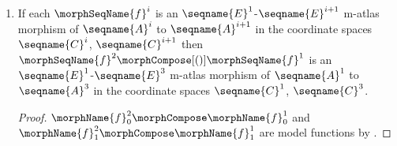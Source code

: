 \documentclass{article}
\begin{document}
\begin{lemma}
\begin{enumerate}
\begin{proof}
\begin{figure}[ht]
\[ \bfig
\node x(0,-1000)[u^1]
\node up1(500,0)[U'^1]
\node upp1(500,-1000)[U''^1]
\node vpp1(500,-2000)[V''^1]
\node vp1(500,-2500)[V'^1]
\node up2(1500,0)[U'^2]
\node uint(1500,-500)[{I^{2,3} = U'^2 \cap \morphName{f}^{-1}_0[U^3]}]
\node upp2(1500,-1000)[U''^2]
\node vpp2(1500,-2000)[V''^2]
\node vhp2(1500,-2500)[\hat{V}'^2]
\node E3(2500,0)[E^3]
\node u3(2500,-500)[U^3]
\node up3(2500,-1000)[U'^3]
\node vp3(2500,-1500)[V'^3]
\node vhp3(2500,-2000)[\hat{V}'^3]
\node v3(2500,-1500)[V^3]
\node c3(2500,-2500)[C^3]
\arrow |a|/^{ (}->/[x`upp1;\morphName{i}]
\arrow |a|[up1`up2;\morphName{f}^1_0]
\arrow |r|/^{ (}->/[upp1`up1;\morphName{i}]
\arrow |a|[upp1`upp2;\morphName{f}^1_0]
\arrow |r|/>->>/[upp1`vpp1;\phi^1]
\arrow |l|//[upp1`vpp1;\iso]
\arrow |a|[vpp1`vpp2;\morphName{f}^1_1]
\arrow |r|/^{ (}->/[vpp1`vp1;\morphName{i}]
\arrow |a|[vp1`vhp2;\morphName{f}^1_1]
\arrow |a|[up2`E3;\morphName{f}^2_0]
\arrow |r|/^{ (}->/[uint`up2;\morphName{i}]
\arrow |a|[uint`u3;\morphName{f}^2_0]
\arrow |r|/^{ (}->/[upp2`uint;\morphName{i}]
\arrow |a|[upp2`up3;\morphName{f}^2_0]
\arrow |r|/>->>/[upp2`vpp2;\phi'^2]
\arrow |l|//[upp2`vpp2;\iso]
\arrow |a|[vpp2`vhp3;\morphName{f}^2_1]
\arrow |a|/^{ (}->/[vpp2`vhp2;\morphName{i}]
\arrow |a|[vhp2`c3;\morphName{f}^2_1]
\arrow |r|/^{ (}->/[u3`E3;\morphName{i}]
\arrow |r|/^{ (}->/[up3`u3;\morphName{i}]
\arrow |r|/>->>/[up3`vp3;\phi^3]
\arrow |l|//[up3`vp3;\iso]
\arrow |r|/>->>/[vp3`vhp3;\hat{\morphName{f}}]
\arrow |l|//[vp3`vhp3;\iso]
\arrow |r|/^{ (}->/[vhp3`c3;\morphName{i}]
\efig \]
\caption{Completed composition of M-atlas near morphisms}
\label{fig:morphcompN2}
\end{figure}

\end{proof}

\item
\label{M-morphcomp:morphcompmorph}
If each $\morphSeqName{f}^i$ is an $\seqname{E}^1$-$\seqname{E}^{i+1}$
m-atlas morphism of $\seqname{A}^i$ to $\seqname{A}^{i+1}$ in the
coordinate spaces $\seqname{C}^i$, $\seqname{C}^{i+1}$ then
$\morphSeqName{f}^2 \morphCompose[()] \morphSeqName{f}^1$ is an
$\seqname{E}^1$-$\seqname{E}^3$ m-atlas morphism of $\seqname{A}^1$ to
$\seqname{A}^3$ in the coordinate spaces $\seqname{C}^1$,
$\seqname{C}^3$.

\begin{proof}
$\morphName{f}^2_0 \morphCompose \morphName{f}^1_0$ and
$\morphName{f}^2_1 \morphCompose \morphName{f}^1_1$ are model functions by
.


\end{proof}
\end{enumerate}
\end{lemma}
\end{document}
